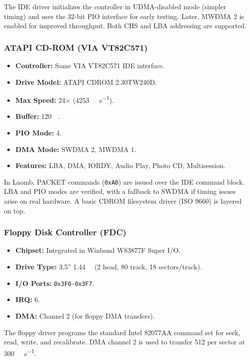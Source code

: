 \documentclass[12pt,a4paper]{report}
\begin{document}
	The IDE driver initializes the controller in UDMA-disabled mode (simpler timing) and uses the 32-bit PIO interface for early testing. Later, MWDMA 2 is enabled for improved throughput. Both CHS and LBA addressing are supported.
	
	\subsubsection{ATAPI CD-ROM (VIA VT82C571)}
	\begin{itemize}
		\item \textbf{Controller:} Same VIA VT82C571 IDE interface.
		\item \textbf{Drive Model:} ATAPI CDROM 2.30TW240D.
		\item \textbf{Max Speed:} 24× (\SI{4253}{\kibi\byte\per\second}).
		\item \textbf{Buffer:} \SI{120}{\kibi\byte}.
		\item \textbf{PIO Mode:} 4.
		\item \textbf{DMA Mode:} SWDMA 2, MWDMA 1.
		\item \textbf{Features:} LBA, DMA, IORDY, Audio Play, Photo CD, Multisession.
	\end{itemize}
	
	In Laomb, PACKET commands (\texttt{0xA0}) are issued over the IDE command block. LBA and PIO modes are verified, with a fallback to SWDMA if timing issues arise on real hardware. A basic CDROM filesystem driver (ISO 9660) is layered on top.
	
	\subsubsection{Floppy Disk Controller (FDC)}
	\begin{itemize}
		\item \textbf{Chipset:} Integrated in Winbond W83877F Super I/O.
		\item \textbf{Drive Type:} 3.5'' \SI{1.44}{\mega\byte} (2 head, 80 track, 18 sectors/track).
		\item \textbf{I/O Ports:} \texttt{0x3F0-0x3F7}.
		\item \textbf{IRQ:} 6.
		\item \textbf{DMA:} Channel 2 (for floppy DMA transfers).
	\end{itemize}
	
	The floppy driver programs the standard Intel 82077AA command set for seek, read, write, and recalibrate. DMA channel 2 is used to transfer \SI{512}{\byte} per sector at \SI{300}{\kibi\byte\per\second}.
	
\end{document}
